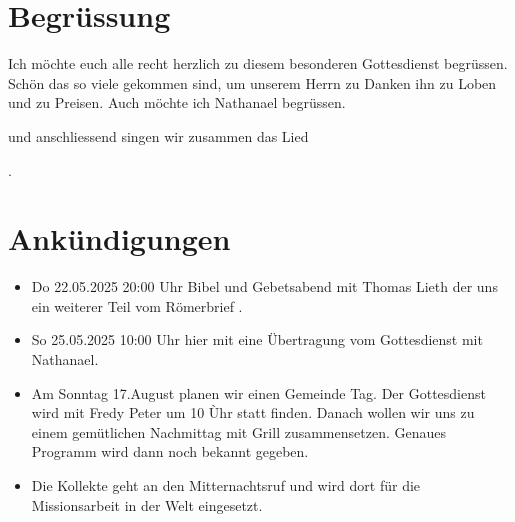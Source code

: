 \documentclass{../../inc/mybib}
\begin{document}
\section{Begrüssung}

Ich möchte euch alle recht herzlich zu diesem besonderen Gottesdienst begrüssen. Schön das so viele gekommen sind, um unserem Herrn zu Danken ihn zu Loben und zu Preisen.
Auch möchte ich Nathanael begrüssen. 

\noindent
\beten{} und anschliessend singen wir zusammen das Lied

\noindent
{}.

\section{Ankündigungen}
\begin{itemize}
    \item {} Do 22.05.2025 20:00 Uhr Bibel und Gebetsabend mit Thomas Lieth der uns ein weiterer Teil vom Römerbrief .
    \item {} So 25.05.2025 10:00 Uhr hier mit eine Übertragung vom Gottesdienst mit Nathanael.    
    \item {} Am Sonntag 17.August planen wir einen Gemeinde Tag. Der Gottesdienst wird mit Fredy Peter um 10 Ùhr statt finden. Danach wollen wir uns zu einem gemütlichen Nachmittag mit Grill zusammensetzen. Genaues Programm wird dann noch bekannt gegeben.
    \item {} Die Kollekte geht an den Mitternachtsruf und wird dort für die Missionsarbeit in der Welt eingesetzt.
\end{itemize}
\end{document}
